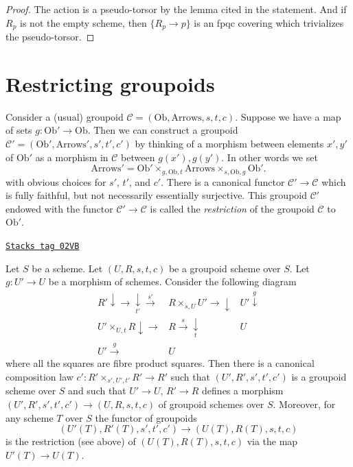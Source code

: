 \begin{proof}
The action is a pseudo-torsor by the lemma cited in the statement.
And if $R_p$ is not the empty scheme, then $\{R_p \to p\}$
is an fpqc covering which trivializes the pseudo-torsor.
\end{proof}

\section{Restricting groupoids}
\label{groupoids-section-restrict-groupoid}
Consider a (usual) groupoid
$\mathcal{C} = (\text{Ob}, \text{Arrows}, s, t, c)$.
Suppose we have a map of sets $g : \text{Ob}' \to \text{Ob}$.
Then we can construct a groupoid
$\mathcal{C}' = (\text{Ob}', \text{Arrows}', s', t', c')$
by thinking of a morphism between elements $x', y'$ of $\text{Ob}'$
as a morphism in $\mathcal{C}$ between $g(x'), g(y')$.
In other words we set
$$
\text{Arrows}' =
\text{Ob}'
\times_{g, \text{Ob}, t}
\text{Arrows}
\times_{s, \text{Ob}, g}
\text{Ob}'.
$$
with obvious choices for $s'$, $t'$, and $c'$. There is a canonical
functor $\mathcal{C}' \to \mathcal{C}$ which is fully faithful,
but not necessarily essentially surjective. This groupoid $\mathcal{C}'$
endowed with the functor $\mathcal{C}' \to \mathcal{C}$
is called the {\it restriction} of the groupoid
$\mathcal{C}$ to $\text{Ob}'$.

\begin{lemma}
\label{groupoids-lemma-restrict-groupoid}
\href{https://stacks.math.columbia.edu/tag/02VB}{\texttt{Stacks tag 02VB}}

Let $S$ be a scheme.
Let $(U, R, s, t, c)$ be a groupoid scheme over $S$.
Let $g : U' \to U$ be a morphism of schemes.
Consider the following diagram
$$
\begin{array}{ccc}R' \downarrow\longrightarrow\underset{t'}{\downarrow}\overset{s'}{\longrightarrow} & R \times_{s, U} U' \longrightarrow\downarrow & U' \overset{g}{\downarrow} \\ U' \times_{U, t} R \downarrow\longrightarrow & R \overset{s}{\longrightarrow}\underset{t}{\downarrow} & U \\ U' \overset{g}{\longrightarrow} & U & \end{array}
$$
where all the squares are fibre product squares. Then there is a
canonical composition law $c' : R' \times_{s', U', t'} R' \to R'$
such that $(U', R', s', t', c')$ is a groupoid scheme over
$S$ and such that $U' \to U$, $R' \to R$ defines a morphism
$(U', R', s', t', c') \to (U, R, s, t, c)$ of groupoid schemes over $S$.
Moreover, for any scheme $T$ over $S$ the functor of groupoids
$$
(U'(T), R'(T), s', t', c') \to (U(T), R(T), s, t, c)
$$
is the restriction (see above) of $(U(T), R(T), s, t, c)$ via the map
$U'(T) \to U(T)$.
\end{lemma}

